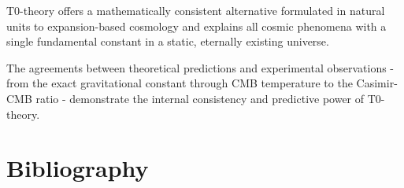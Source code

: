 \documentclass[12pt,a4paper]{article}
\begin{document}
	\begin{revolutionary}
		T0-theory offers a mathematically consistent alternative formulated in natural units to expansion-based cosmology and explains all cosmic phenomena with a single fundamental constant in a static, eternally existing universe.
	\end{revolutionary}
	
	The agreements between theoretical predictions and experimental observations - from the exact gravitational constant through CMB temperature to the Casimir-CMB ratio - demonstrate the internal consistency and predictive power of T0-theory.
	
	\section{Bibliography}
	
\end{document}
